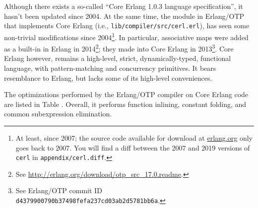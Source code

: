 Although there exists a so-called ``Core Erlang 1.0.3 language
specification''\cite{erlang:2004:core-spec}, it hasn't been updated
since 2004. At the same time, the module in Erlang/OTP that implements
Core Erlang (i.e., \texttt{lib/compiler/src/cerl.erl}), has seen some
non-trivial modifications since 2004\footnote{At least, since 2007;
the source code available for download at \url{erlang.org} only goes
back to 2007. You will find a diff between the 2007 and 2019 versions
of \texttt{cerl} in \texttt{appendix/cerl.diff}.}. In particular,
associative maps were added as a built-in in Erlang in
2014\footnote{See
\url{http://erlang.org/download/otp_src_17.0.readme}.}; they made into
Core Erlang in 2013\footnote{See Erlang/OTP commit ID
\texttt{d4379900790b37498fefa237cd03ab2d5781bb6a}.}. Core Erlang
however, remains a high-level, strict, dynamically-typed, functional
language, with pattern-matching and concurrency primitives.  It bears
resemblance to Erlang, but lacks some of its high-level conveniences.

The optimizations performed by the Erlang/OTP compiler on Core Erlang
code are listed in Table .
Overall, it performs function inlining, constant folding, and common
subexpression elimination.

